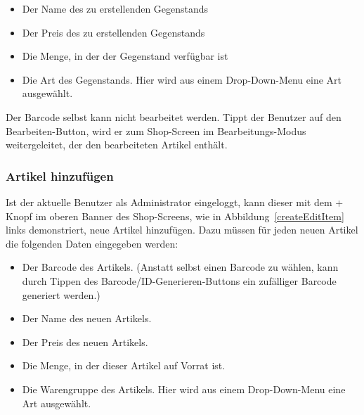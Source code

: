 \begin{itemize}
	\item Der Name des zu erstellenden Gegenstands

	\item Der Preis des zu erstellenden Gegenstands

	\item Die Menge, in der der Gegenstand verfügbar ist

	\item Die Art des Gegenstands.
	Hier wird aus einem Drop-Down-Menu eine Art ausgewählt.
\end{itemize}

Der Barcode selbst kann nicht bearbeitet werden.
Tippt der Benutzer auf den Bearbeiten-Button, wird er zum Shop-Screen im Bearbeitungs-Modus weitergeleitet, der den bearbeiteten Artikel enthält.


\subsubsection{Artikel hinzufügen} \label{subsubsec:shop-add-items}

Ist der aktuelle Benutzer als Administrator eingeloggt, kann dieser mit dem + Knopf im oberen Banner des Shop-Screens, wie in Abbildung~\ref{createEditItem} links demonstriert, neue Artikel hinzufügen.
Dazu müssen für jeden neuen Artikel die folgenden Daten eingegeben werden:

\begin{itemize}
	\item Der Barcode des Artikels. (Anstatt selbst einen Barcode zu wählen, kann durch Tippen des Barcode/ID-Generieren-Buttons ein zufälliger Barcode generiert werden.)

	\item Der Name des neuen Artikels.

	\item Der Preis des neuen Artikels.

	\item Die Menge, in der dieser Artikel auf Vorrat ist.

	\item Die Warengruppe des Artikels.
	Hier wird aus einem Drop-Down-Menu eine Art ausgewählt.
\end{itemize}

